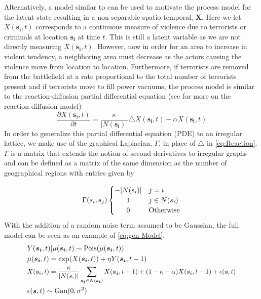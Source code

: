 \documentclass[11pt]{isuthesis}
\begin{document}
Alternatively, a model similar to \cite{short2008statistical} can be used to motivate the process model for the latent state resulting in a non-separable spatio-temporal, $\boldsymbol{X}$.  Here we let $X(\boldsymbol{s_i},t)$ corresponds to a continuous measure of violence due to terrorists or criminals at location $\boldsymbol{s_i}$ at time $t$. This is still a latent variable as we are not directly measuring $X(\boldsymbol{s_i},t)$.  However, now in order for an area to increase in violent tendency, a neighboring area must decrease as the actors causing the violence move from location to location.  Furthermore, if terrorists are removed from the battlefield at a rate proportional to the total number of terrorists present and if terrorists move to fill power vacuums, the process model is similar to the reaction-diffusion partial differential equation (see \cite{cressie2015statistics} for more on the reaction-diffusion model)
\begin{equation}
\frac{\partial X(\boldsymbol{s_i},t)}{\partial t}=\frac{\kappa}{|N(\boldsymbol{s_i})|} \triangle X(\boldsymbol{s_i},t)-\alpha X(\boldsymbol{s_i},t) \label{eq:Reaction}
\end{equation}
In order to generalize this partial differential equation (PDE) to an irregular lattice, we make use of the graphical Laplacian, $\Gamma$, in place of $\triangle$ in \eqref{eq:Reaction}. $\Gamma$ is a matrix that extends the notion of second derivatives to irregular graphs and can be defined as a matrix of the same dimension as the number of geographical regions with entries given by

\[
\Gamma (s_i,s_j)
\begin{cases} 
\hfill -|N(s_i)|   \hfill &  j=i \\
\hfill 1 \hfill & j\in N(s_i)  \\
\hfill 0 \hfill& \text{Otherwise}
\end{cases}
\]
With the addition of a random noise term assumed to be Gaussian, the full model can be seen as an example of \eqref{eq:gen Model}.
\begin{align}
& Y(\boldsymbol{s_i},t)|\mu(\boldsymbol{s_i},t) \sim \mbox{Pois}(\mu(\boldsymbol{s_i},t)) \label{eq:ReacDiffuse Model}\\
& \mu(\boldsymbol{s_i},t) = \exp(X(\boldsymbol{s_i},t)) + \eta Y(\boldsymbol{s_i},t-1) \nonumber \\
& \small X(\boldsymbol{s_i},t) = \frac{\kappa}{|N(s_i)|} \sum_{\boldsymbol{s_j}\in N(\boldsymbol{s_i})}X(\boldsymbol{s_j},t-1) + (1-\kappa-\alpha)  X(\boldsymbol{s_i},t-1) + \epsilon(\boldsymbol{s},t) \nonumber\\
&\epsilon(\boldsymbol{s},t) \sim \mbox{Gau}(0,\sigma^2) \nonumber
\end{align}
\end{document}
